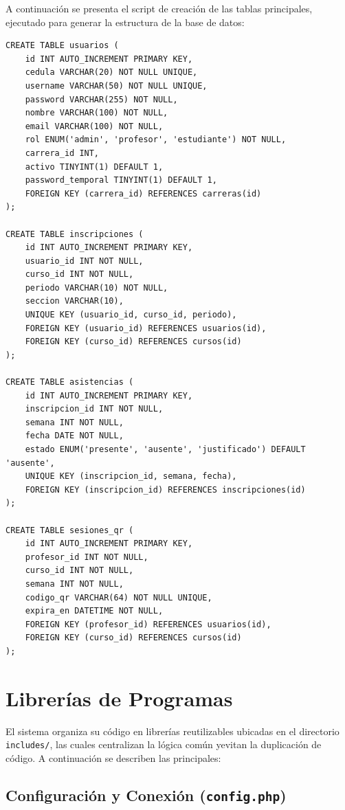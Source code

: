 \documentclass[12pt, letterpaper, oneside]{report}
\begin{document}
A continuaci\'on se presenta el script de creaci\'on de las tablas principales, ejecutado para generar la estructura de la base de datos:

\begin{lstlisting}[caption=Fragmento del esquema de base de datos (\texttt{sql/schema.sql})]
CREATE TABLE usuarios (
    id INT AUTO_INCREMENT PRIMARY KEY,
    cedula VARCHAR(20) NOT NULL UNIQUE,
    username VARCHAR(50) NOT NULL UNIQUE,
    password VARCHAR(255) NOT NULL,
    nombre VARCHAR(100) NOT NULL,
    email VARCHAR(100) NOT NULL,
    rol ENUM('admin', 'profesor', 'estudiante') NOT NULL,
    carrera_id INT,
    activo TINYINT(1) DEFAULT 1,
    password_temporal TINYINT(1) DEFAULT 1,
    FOREIGN KEY (carrera_id) REFERENCES carreras(id)
);

CREATE TABLE inscripciones (
    id INT AUTO_INCREMENT PRIMARY KEY,
    usuario_id INT NOT NULL,
    curso_id INT NOT NULL,
    periodo VARCHAR(10) NOT NULL,
    seccion VARCHAR(10),
    UNIQUE KEY (usuario_id, curso_id, periodo),
    FOREIGN KEY (usuario_id) REFERENCES usuarios(id),
    FOREIGN KEY (curso_id) REFERENCES cursos(id)
);

CREATE TABLE asistencias (
    id INT AUTO_INCREMENT PRIMARY KEY,
    inscripcion_id INT NOT NULL,
    semana INT NOT NULL,
    fecha DATE NOT NULL,
    estado ENUM('presente', 'ausente', 'justificado') DEFAULT 'ausente',
    UNIQUE KEY (inscripcion_id, semana, fecha),
    FOREIGN KEY (inscripcion_id) REFERENCES inscripciones(id)
);

CREATE TABLE sesiones_qr (
    id INT AUTO_INCREMENT PRIMARY KEY,
    profesor_id INT NOT NULL,
    curso_id INT NOT NULL,
    semana INT NOT NULL,
    codigo_qr VARCHAR(64) NOT NULL UNIQUE,
    expira_en DATETIME NOT NULL,
    FOREIGN KEY (profesor_id) REFERENCES usuarios(id),
    FOREIGN KEY (curso_id) REFERENCES cursos(id)
);
\end{lstlisting}

\section{Librer\'ias de Programas}

El sistema organiza su c\'odigo en librer\'ias reutilizables ubicadas en el directorio \texttt{includes/}, las cuales centralizan la l\'ogica com\'un yevitan la duplicaci\'on de c\'odigo. A continuaci\'on se describen las principales:

\subsection*{Configuraci\'on y Conexi\'on (\texttt{config.php})}
\end{document}
